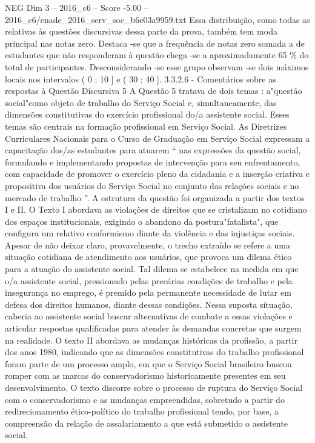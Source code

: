 \begin{textsample}{NEG Dim 3 – 2016\_c6 – Score -5.00 – 2016\_c6/enade\_2016\_serv\_soc\_b6e03a9959.txt}
Essa distribuição, como todas as relativas às questões discursivas dessa parte da prova, também tem moda principal nas notas zero.
Destaca -se que a frequência de notas zero somada a de estudantes que não responderam à questão chega -se a aproximadamente 65 \% do total de participantes.
Desconsiderando -se esse grupo observam -se dois máximos locais nos intervalos ( 0 ; 10 ] e ( 30 ; 40 ]. 3.3.2.6 - Comentários sobre as respostas à Questão Discursiva 5 A Questão 5 tratava de dois temas : a"questão social"como objeto de trabalho do Serviço Social e, simultaneamente, das dimensões constitutivas do exercício profissional do/a assistente social.
Esses temas são centrais na formação profissional em Serviço Social.
As Diretrizes Curriculares Nacionais para o Curso de Graduação em Serviço Social expressam a capacitação dos/as estudantes para atuarem “ nas expressões da questão social, formulando e implementando propostas de intervenção para seu enfrentamento, com capacidade de promover o exercício pleno da cidadania e a inserção criativa e propositiva dos usuários do Serviço Social no conjunto das relações sociais e no mercado de trabalho ”.
A estrutura da questão foi organizada a partir dos textos I e II.
O Texto I abordava as violações de direitos que se cristalizam no cotidiano dos espaços institucionais, exigindo o abandono da postura"fatalista", que configura um relativo conformismo diante da violência e das injustiças sociais.
Apesar de não deixar claro, provavelmente, o trecho extraído se refere a uma situação cotidiana de atendimento aos usuários, que provoca um dilema ético para a atuação do assistente social.
Tal dilema se estabelece na medida em que o/a assistente social, pressionado pelas precárias condições de trabalho e pela insegurança no emprego, é premido pela permanente necessidade de lutar em defesa dos direitos humanos, diante dessas condições.
Nessa suposta situação, caberia ao assistente social buscar alternativas de combate a essas violações e articular respostas qualificadas para atender às demandas concretas que surgem na realidade.
O texto II abordava as mudanças históricas da profissão, a partir dos anos 1980, indicando que as dimensões constitutivas do trabalho profissional foram parte de um processo amplo, em que o Serviço Social brasileiro buscou romper com as marcas do conservadorismo historicamente presentes em seu desenvolvimento.
O texto discorre sobre o processo de ruptura do Serviço Social com o conservadorismo e as mudanças empreendidas, sobretudo a partir do redirecionamento ético-político do trabalho profissional tendo, por base, a compreensão da relação de assalariamento a que está submetido o assistente social.

\end{textsample}
